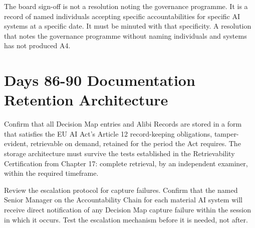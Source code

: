 The board sign-off is not a resolution noting the governance programme. It is a record of named individuals accepting specific accountabilities for specific AI systems at a specific date. It must be minuted with that specificity. A resolution that notes the governance programme without naming individuals and systems has not produced A4.

\section{Days 86-90 Documentation Retention Architecture}

Confirm that all Decision Map entries and Alibi Records are stored in a form that satisfies the EU AI Act's Article 12 record-keeping obligations, tamper-evident, retrievable on demand, retained for the period the Act requires. The storage architecture must survive the tests established in the Retrievability Certification from Chapter 17: complete retrieval, by an independent examiner, within the required timeframe.

Review the escalation protocol for capture failures. Confirm that the named Senior Manager on the Accountability Chain for each material AI system will receive direct notification of any Decision Map capture failure within the session in which it occurs. Test the escalation mechanism before it is needed, not after.

